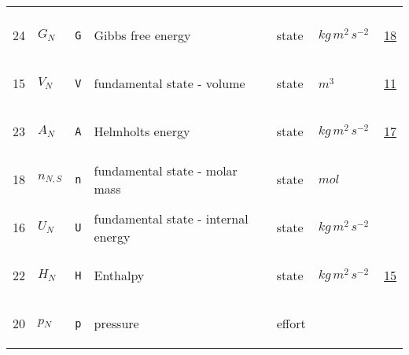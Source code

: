\begin{longtable}{|p{1cm}|p{2.5cm}|p{4.5cm}|p{8cm}|p{3.0cm}|p{3cm}|p{1cm}|}
             & \\
            24
             & \hypertarget{"v:24"}{ $ {G}{_{N}} $}
             & \verb|G|
             & Gibbs free energy
             & \begin{lay}state \end{lay}
             & $ kg \,m^{2} \,s^{-2} \, $
             &                 \hyperlink{"e:18"}{ 18 }
                 \\
            15
             & \hypertarget{"v:15"}{ $ {V}{_{N}} $}
             & \verb|V|
             & fundamental state - volume
             & \begin{lay}state \end{lay}
             & $ m^{3} \, $
             &                 \hyperlink{"e:11"}{ 11 }
                 \\
            23
             & \hypertarget{"v:23"}{ $ {A}{_{N}} $}
             & \verb|A|
             & Helmholts energy
             & \begin{lay}state \end{lay}
             & $ kg \,m^{2} \,s^{-2} \, $
             &                 \hyperlink{"e:17"}{ 17 }
                 \\
            18
             & \hypertarget{"v:18"}{ $ {n}{_{N, S}} $}
             & \verb|n|
             & fundamental state - molar mass
             & \begin{lay}state \end{lay}
             & $ mol \, $
             & \\
            16
             & \hypertarget{"v:16"}{ $ {U}{_{N}} $}
             & \verb|U|
             & fundamental state - internal energy
             & \begin{lay}state \end{lay}
             & $ kg \,m^{2} \,s^{-2} \, $
             & \\
            22
             & \hypertarget{"v:22"}{ $ {H}{_{N}} $}
             & \verb|H|
             & Enthalpy
             & \begin{lay}state \end{lay}
             & $ kg \,m^{2} \,s^{-2} \, $
             &                 \hyperlink{"e:15"}{ 15 }
                 \\
            20
             & \hypertarget{"v:20"}{ $ {p}{_{N}} $}
             & \verb|p|
             & pressure
             & \begin{lay}effort \end{lay}

\end{longtable}
